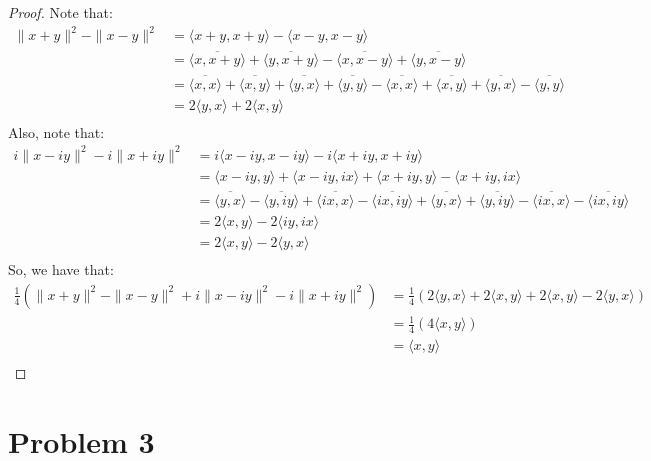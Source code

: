 \documentclass{article}
\begin{document}
\begin{proof}
Note that:
\begin{align*}
\|x + y\|^2 - \|x - y\|^2  &= \langle x + y, x + y \rangle - \langle x - y, x - y \rangle \\
&= \overline{\langle x, x + y \rangle} + \overline{\langle y, x + y \rangle} - \overline{\langle x, x - y \rangle} + \overline{\langle y, x - y \rangle} \\
&= \overline{\langle x, x \rangle} + \overline{\langle x, y \rangle} + \overline{\langle y, x \rangle} + \overline{\langle y, y \rangle} - \overline{\langle x, x \rangle} + \overline{\langle x, y \rangle} + \overline{\langle y, x \rangle} - \overline{\langle y, y \rangle} \\
&=  2\langle y, x \rangle  + 2\langle x, y \rangle \\
\end{align*}
Also, note that:
\begin{align*}
i\|x - iy\|^2 - i\|x + iy\|^2 &= i\langle x - iy, x - iy \rangle - i\langle x + iy, x + iy \rangle \\
&= \langle x - iy, y \rangle + \langle x - iy, ix \rangle + \langle x + iy, y \rangle - \langle x + iy, ix \rangle \\
&= \overline{\langle y, x \rangle} - \overline{\langle y, iy \rangle} + \overline{\langle ix, x \rangle} - \overline{\langle ix, iy \rangle} + \overline{\langle y, x \rangle} + \overline{\langle y, iy \rangle} - \overline{\langle ix, x \rangle} - \overline{\langle ix, iy \rangle} \\
&= 2\langle x, y \rangle - 2\langle iy, ix \rangle \\
&= 2\langle x, y \rangle - 2\langle y, x \rangle \\
\end{align*}
So, we have that:
\begin{align*}
\frac{1}{4}(\|x + y\|^2 - \|x - y\|^2 + i\|x - iy\|^2 - i\|x + iy\|^2) &= \frac{1}{4}(2\langle y, x \rangle  + 2\langle x, y \rangle + 2\langle x, y \rangle - 2\langle y, x \rangle) \\
&= \frac{1}{4}(4\langle x, y \rangle) \\
&= \langle x, y \rangle \\
\end{align*}
\end{proof}


\section*{Problem 3}
\end{document}
